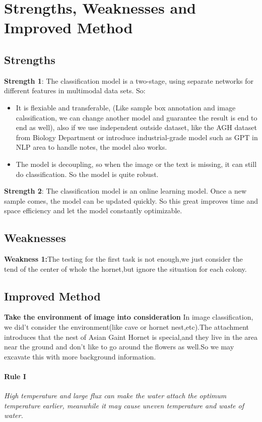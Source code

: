 \documentclass[12pt]{article}
\begin{document}
\section{Strengths, Weaknesses and Improved Method}
\subsection{Strengths}
\textbf{Strength 1}: The classification model is a two-stage, using separate networks for different features in multimodal data sets. So:
\begin{itemize}
	\item  It is flexiable and transferable, (Like sample box annotation and image calssification, we can change another model and guarantee the result is end to end as well), also if we use independent outside dataset, like the AGH dataset from Biology Department or introduce industrial-grade model such as GPT in NLP area to handle notes, the model also works.
	\item  The model is decoupling, so when the image or the text is missing, it can still do classification. So the model is quite robust.
\end{itemize}

\textbf{Strength 2}: The classification model is an online learning model. Once a new sample comes, the model can be updated quickly. So this great improves time and space efficiency and let the model constantly optimizable.

\subsection{Weaknesses}
\textbf{Weakness 1:}The testing for the first task is not enough,we just consider the tend of the center of whole the hornet,but ignore the situation for each colony.

\subsection{Improved Method}
\textbf{Take the environment of image into consideration}
In image classification, we did't consider the environment(like cave or hornet nest,etc).The attachment introduces that the nest of Asian Gaint Hornet is special,and they live in the area near the ground and don't like to go around the flowers as well.So we may excavate this with more background information.

\paragraph{Rule I}
\emph{High temperature and large flux can make the water attach the optimum temperature earlier,
	meanwhile it may cause uneven temperature and waste of water.}
\end{document}

